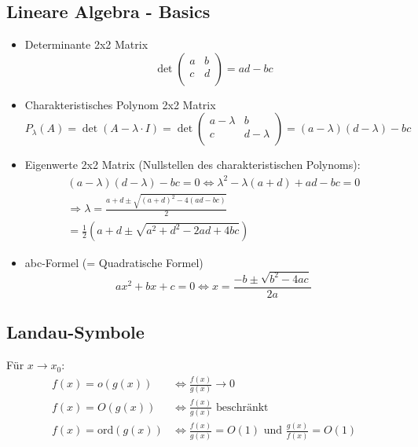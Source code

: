\documentclass[a4paper]{article}
\begin{document}
\subsection{Lineare Algebra - Basics}
\begin{itemize}
	\item Determinante 2x2 Matrix
		\[
		\det \begin{pmatrix} 
			a & b \\
			c & d \\
		\end{pmatrix} 
		= ad - bc
		\] 
	\item Charakteristisches Polynom 2x2 Matrix
		\[
			P_\lambda (A)
			= \det (A - \lambda \cdot I) =
			\det \begin{pmatrix} 
				a - \lambda & b \\
				c & d - \lambda \\
			\end{pmatrix} =
			(a - \lambda) (d - \lambda) - bc
		\] 
	\item Eigenwerte 2x2 Matrix
		(Nullstellen des charakteristischen Polynoms):
		\begin{gather*}
			(a - \lambda) (d - \lambda) - bc = 0
			\Leftrightarrow 
			\lambda ^2 - \lambda (a + d) + ad - bc = 0 \\
			\Rightarrow
			\lambda = \frac{ a+d \pm \sqrt{(a+d) ^2 -4 (ad -bc)} }{ 2 } \\
			= \frac{ 1 }{ 2 } \left(
				a + d \pm \sqrt{
					a ^2 + d ^2 - 2 ad + 4 bc
				} 
			\right) 
		\end{gather*}
	\item abc-Formel (= Quadratische Formel)
		\[
			a x ^2 + b x + c = 0
			\Leftrightarrow 
			x = \frac{ -b \pm \sqrt{b ^2 - 4 ac} }{ 2a }
		\] 
\end{itemize}

\subsection{Landau-Symbole}
Für $x \to x_0$:
\begin{align*}
	f(x) = o(g(x))
	&\Leftrightarrow \frac{ f(x) }{ g(x) } \to 0 \\
	f(x) = O(g(x))
	&\Leftrightarrow \frac{ f(x) }{ g(x) } \text{ beschränkt } \\
	f(x) = \text{ord}(g(x))
	&\Leftrightarrow 
	\frac{ f(x) }{ g(x) } = O(1) \text{ und }
	\frac{ g(x) }{ f(x) } = O(1)
\end{align*}

\pagebreak
\end{document}

